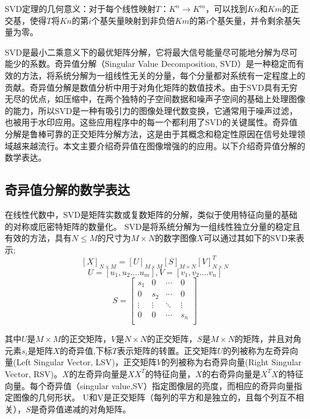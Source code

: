 \documentclass[12pt]{book}
\begin{document}
SVD定理的几何意义：对于每个线性映射$T：K^n→K^m$，可以找到$Kn$和$Km$的正交基，使得$T$将$Kn$的第$i$个基矢量映射到非负倍$Km$的第$i$个基矢量，并令剩余基矢量为零。

SVD是最小二乘意义下的最优矩阵分解，它将最大信号能量尽可能地分解为尽可能少的系数。奇异值分解（Singular Value Decomposition, SVD）是一种稳定而有效的方法，将系统分解为一组线性无关的分量，每个分量都对系统有一定程度上的贡献。奇异值分解是数值分析中用于对角化矩阵的数值技术。由于SVD具有无穷无尽的优点，如压缩中，在两个独特的子空间数据和噪声子空间的基础上处理图像的能力，所以SVD是一种有吸引力的图像处理代数变换，它通常用于噪声过滤，也被用于水印应用。这些应用程序中的每一个都利用了SVD的关键属性。奇异值分解是鲁棒可靠的正交矩阵分解方法，这是由于其概念和稳定性原因在信号处理领域越来越流行。本文主要介绍奇异值在图像增强的的应用。以下介绍奇异值分解的数学表达。
			\subsection{奇异值分解的数学表达}在线性代数中，SVD是矩阵实数或复数矩阵的分解，类似于使用特征向量的基础的对称或厄密特矩阵的数量化。 SVD是将系统分解为一组线性独立分量的稳定且有效的方法，具有$N \leq M$的尺寸为$M×N$的数字图像$X$可以通过其如下的SVD来表示;
\begin{equation}	\left[ X \right] _{N×M}=\left[ U \right] _{M×M} \left[ S \right] _{M×N} \left[ V \right] ^T_{N×N}	\end{equation}			
\[ U=[u_1,u_2....u_m],	V=[v_1,v_2....v_n] \]
\[
S
=\begin{bmatrix}
s_1  &  0  & \cdots\ &0\\
0  &  s_2  & \cdots\ & 0\\
 \vdots   & \vdots & \ddots  & \vdots  \\
 0 & 0  & \cdots\ & s_n\\
\end{bmatrix}
\]

其中$U$是$M×M$的正交矩阵，$V$是$N×N$的正交矩阵，$S$是$M×N$的矩阵，并且对角元素$s_i$是矩阵$X$的奇异值,下标$T$表示矩阵的转置。正交矩阵$U$的列被称为左奇异向量(Left Singular Vector, LSV)，正交矩阵$V$的列被称为右奇异向量(Right Singular Vector, RSV)。$X$的左奇异向量是$XX^T$的特征向量，$X$的右奇异向量是$X^TX$的特征向量。每个奇异值（singular value,SV）指定图像层的亮度，而相应的奇异向量指定图像的几何形状。 U和V是正交矩阵（每列的平方和是独立的，且每个列互不相关），$S$是奇异值递减的对角矩阵。%
\end{document}
